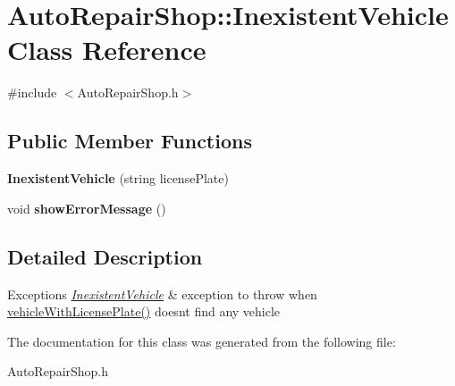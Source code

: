 \hypertarget{class_auto_repair_shop_1_1_inexistent_vehicle}{}\section{Auto\+Repair\+Shop\+:\+:Inexistent\+Vehicle Class Reference}
\label{class_auto_repair_shop_1_1_inexistent_vehicle}


{\ttfamily \#include $<$Auto\+Repair\+Shop.\+h$>$}

\subsection*{Public Member Functions}
\begin{DoxyCompactItemize}
\item 
\hypertarget{class_auto_repair_shop_1_1_inexistent_vehicle_a0407499d2b9344073f5374a8a1e08bfb}{}{\bfseries Inexistent\+Vehicle} (string license\+Plate)\label{class_auto_repair_shop_1_1_inexistent_vehicle_a0407499d2b9344073f5374a8a1e08bfb}

\item 
\hypertarget{class_auto_repair_shop_1_1_inexistent_vehicle_ab663cb9d1dc102256af11334bd9dd042}{}void {\bfseries show\+Error\+Message} ()\label{class_auto_repair_shop_1_1_inexistent_vehicle_ab663cb9d1dc102256af11334bd9dd042}

\end{DoxyCompactItemize}


\subsection{Detailed Description}

\begin{DoxyExceptions}{Exceptions}
{\em \hyperlink{class_auto_repair_shop_1_1_inexistent_vehicle}{Inexistent\+Vehicle}} & exception to throw when \hyperlink{class_auto_repair_shop_afe7e5e9fdfb2c2e1e672eec1702999f4}{vehicle\+With\+License\+Plate()} doesn\textquotesingle{}t find any vehicle \\
\hline
\end{DoxyExceptions}


The documentation for this class was generated from the following file\+:\begin{DoxyCompactItemize}
\item 
Auto\+Repair\+Shop.\+h\end{DoxyCompactItemize}

